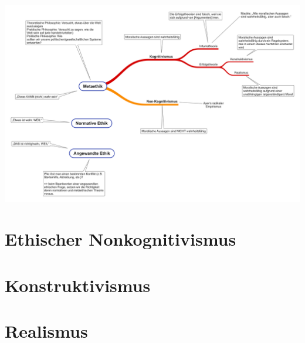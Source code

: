 \documentclass[../main.tex]{subfiles}
\begin{document}
\includegraphics[width=\textwidth]{images/Metaethik_Stroemungen.png}

\section{Ethischer Nonkognitivismus}


\section{Konstruktivismus}


\section{Realismus}

\end{document}

